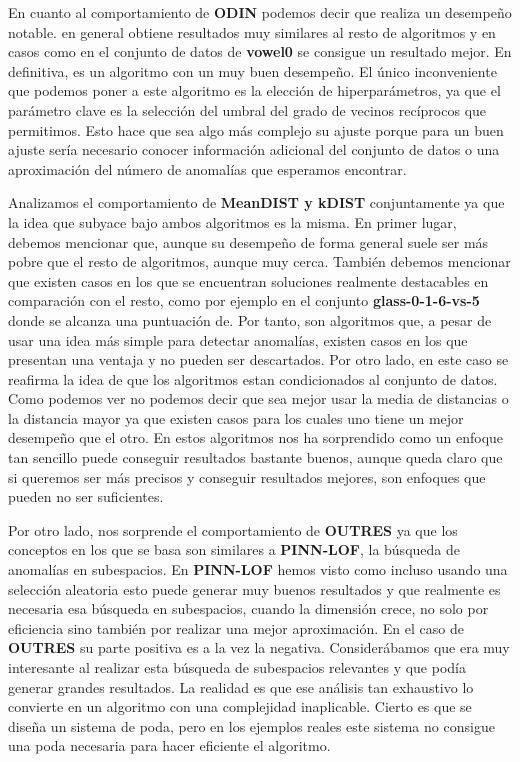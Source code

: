 En cuanto al comportamiento de \textbf{ODIN} podemos decir que realiza un desempeño notable. en general 
obtiene resultados muy similares al resto de algoritmos y en casos como en el conjunto de datos de  
\textbf{vowel0} se consigue un resultado mejor. En definitiva, es un algoritmo con un muy buen 
desempeño. El único inconveniente que podemos poner a este algoritmo es la elección 
de hiperparámetros, ya que el parámetro clave es la selección del umbral del grado de vecinos 
recíprocos que permitimos. Esto hace que sea algo más complejo su ajuste porque para un buen ajuste sería necesario 
conocer información adicional del conjunto de datos o una aproximación del número de anomalías que esperamos 
encontrar. 

Analizamos el comportamiento de \textbf{MeanDIST y kDIST} conjuntamente ya que la idea que subyace bajo 
ambos algoritmos es la misma. En primer lugar, debemos mencionar que, aunque su desempeño de forma general 
suele ser más pobre que el resto de algoritmos, aunque muy cerca. También debemos mencionar que existen casos 
en los que se encuentran soluciones realmente destacables en comparación con el resto, como por ejemplo en  
el conjunto \textbf{glass-0-1-6-vs-5} donde se alcanza una puntuación de. Por tanto, son algoritmos 
que, a pesar de usar una idea más simple para detectar anomalías, existen casos en los que presentan una ventaja 
y no pueden ser descartados. Por otro lado, en este caso se reafirma la idea de que los algoritmos estan condicionados 
al conjunto de datos. Como podemos ver no podemos decir que sea mejor usar la media de distancias o la distancia mayor 
ya que existen casos para los cuales uno tiene un mejor desempeño que el otro. En estos algoritmos nos ha sorprendido 
como un enfoque tan sencillo puede conseguir resultados bastante buenos, aunque queda claro que si queremos 
ser más precisos y conseguir resultados mejores, son enfoques que pueden no ser suficientes. 

Por otro lado, nos sorprende el comportamiento de \textbf{OUTRES} 
ya que los conceptos en los que se basa son similares a \textbf{PINN-LOF}, 
la búsqueda de anomalías en subespacios. En \textbf{PINN-LOF} hemos visto como incluso usando 
una selección aleatoria esto puede generar muy buenos resultados y que realmente es necesaria esa  
búsqueda en subespacios, cuando la dimensión crece, no solo por eficiencia sino también por realizar 
una mejor aproximación. En el caso de \textbf{OUTRES} su parte positiva es a la vez la negativa. Considerábamos 
que era muy interesante al realizar esta búsqueda de subespacios relevantes y que podía generar grandes resultados. 
La realidad es que ese análisis tan exhaustivo lo convierte en un algoritmo con una complejidad inaplicable. 
Cierto es que se diseña un sistema de poda, pero en los ejemplos reales este sistema no consigue una poda necesaria 
para hacer eficiente el algoritmo. 


